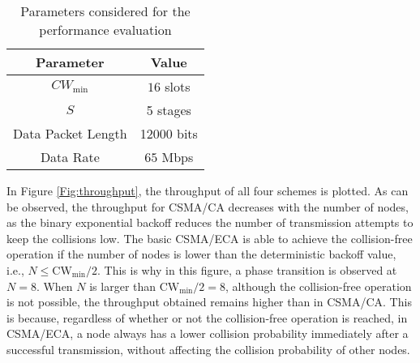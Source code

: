 \documentclass[conference]{IEEEtran}
\begin{document}
\begin{table}[h!!!]
\centering
\begin{tabular}{c|c}
Parameter & Value \\
\hline
$CW_{\min}$ & $16$ slots \\
$S$ & 5 stages\\
Data Packet Length & 12000 bits \\
Data Rate & $65$ Mbps\\
\hline
\end{tabular}

\caption{Parameters considered for the performance evaluation}\label{Tbl:parameters}

\end{table}



In Figure \ref{Fig:throughput}, the throughput of all four schemes is plotted. As can be observed, the throughput for CSMA/CA decreases with the number of nodes, as the binary exponential backoff reduces the number of transmission attempts to keep the collisions low. The basic CSMA/ECA is able to achieve the collision-free operation if the number of nodes is lower than the deterministic backoff value, i.e., $N\leq \text{CW}_{\min}/2$. This is why in this figure, a phase transition is observed at $N=8$. When $N$ is larger than $\text{CW}_{\min}/2=8$, although the collision-free operation is not possible, the throughput obtained remains higher than in CSMA/CA. This is because, regardless of whether or not the collision-free operation is reached, in CSMA/ECA, a node always has a lower collision probability immediately after a successful transmission, without affecting the collision probability of other nodes.
\end{document}

